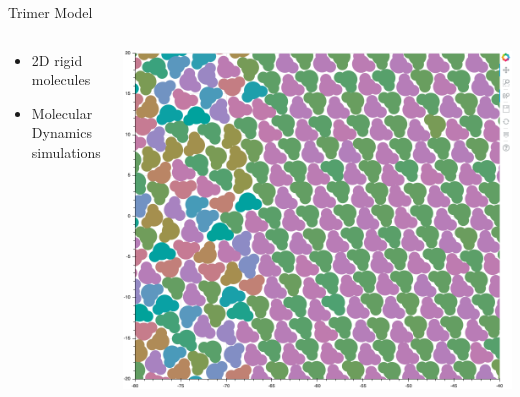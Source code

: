 \documentclass[aspectratio=169, 14pt]{beamer}
\begin{document}
\begin{frame}{Trimer Model}

  \begin{columns}
    \begin{column}{0.4\textwidth}
      \begin{itemize}
        \item 2D rigid molecules
        \item Molecular Dynamics simulations
      \end{itemize}
    \end{column}
    \begin{column}{0.6\textwidth}
      \includegraphics[width=\textwidth]{Trimer_snapshot.png}
    \end{column}
  \end{columns}
\end{frame}
\end{document}

